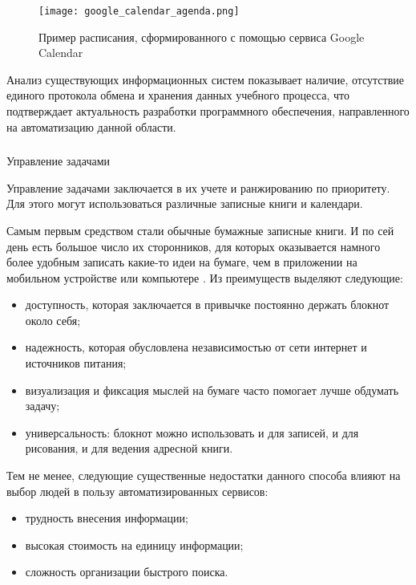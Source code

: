 \begin{figure}[!h]
	\centering
	\texttt{[image: google\_calendar\_agenda.png]} 
	\caption{Пример расписания, сформированного с помощью сервиса Google Calendar}
	\label{fig:analysis:analogues:google_calendar}
\end{figure}

Анализ существующих информационных систем показывает наличие, отсутствие единого протокола обмена и хранения данных уче\-б\-но\-го процесса, что подтверждает актуальность разработки программного обе\-с\-пе\-че\-ния, направленного на автоматизацию данной области.

\subsubsection{} Управление задачами
\label{sec:analysis:analogues:tasks}

Управление задачами заключается в их учете и ранжированию по приоритету. Для этого могут использоваться различные записные книги и календари.

Самым первым средством стали обычные бумажные записные книги. И по сей день есть большое число их сторонников, для которых оказывается намного более удобным записать какие-то идеи на бумаге, чем в приложении на мобильном устройстве или компьютере \cite{paper_notebooks_power}. Из преимуществ выделяют следующие:

\begin{itemize}
	\item доступность, которая заключается в привычке постоянно держать бло\-к\-нот около себя;
	\item надежность, которая обусловлена независимостью от сети интернет и источников питания;
	\item визуализация и фиксация мыслей на бумаге часто помогает лучше обдумать задачу;
	\item универсальность: блокнот можно использовать и для записей, и для рисования, и для ведения адресной книги.
\end{itemize}

Тем не менее, следующие существенные недостатки данного способа влияют на выбор людей в пользу автоматизированных сервисов:

\begin{itemize}
	\item трудность внесения информации;
	\item высокая стоимость на единицу информации;
	\item сложность организации быстрого поиска.
\end{itemize}


